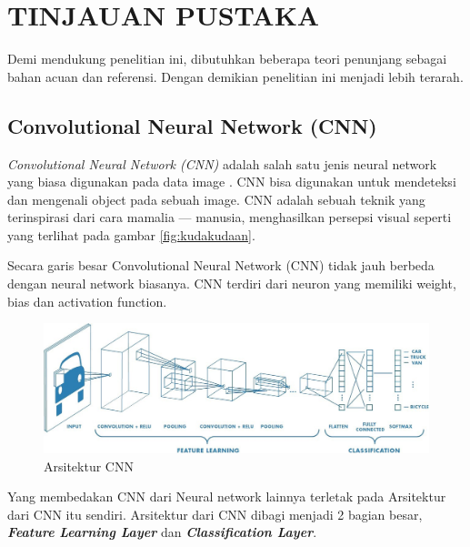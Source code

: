 \chapter{TINJAUAN PUSTAKA}
\label{chap:tinjauanpustaka}


Demi mendukung penelitian ini, dibutuhkan beberapa teori penunjang sebagai bahan acuan dan referensi. Dengan demikian penelitian ini menjadi lebih terarah.

\section{Convolutional Neural Network (CNN)}
\label{sec:cnn}

\emph{Convolutional Neural Network (CNN)} adalah salah satu jenis neural network yang biasa digunakan pada data image \cite{cit:cnn}. CNN bisa digunakan untuk mendeteksi dan mengenali object pada sebuah image. CNN adalah sebuah teknik yang terinspirasi dari cara mamalia — manusia, menghasilkan persepsi visual seperti yang terlihat pada gambar \ref{fig:kudakudaan}.

Secara garis besar Convolutional Neural Network (CNN) tidak jauh berbeda dengan neural network biasanya. CNN terdiri dari neuron yang memiliki weight, bias dan activation function. 

\begin{figure}[ht]
	\centering
	
	\includegraphics[width=1\columnwidth]{gambar/cnn.jpeg}
	
	\caption{Arsitektur CNN \citep{cit:cnn}}
	\label{fig:cnn}
\end{figure}

Yang membedakan CNN dari Neural network lainnya terletak pada Arsitektur dari CNN itu sendiri. Arsitektur dari CNN dibagi menjadi 2 bagian besar, \textit{\textbf{Feature Learning Layer}} dan \textit{\textbf{Classification Layer}}.

